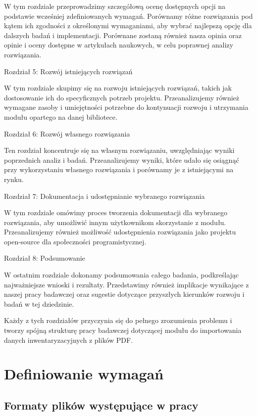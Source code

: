 \documentclass[a4paper,twoside,12pt]{book}
\begin{document}
W tym rozdziale przeprowadzimy szczegółową ocenę dostępnych opcji na podstawie wcześniej zdefiniowanych wymagań. Porównamy różne rozwiązania pod kątem ich zgodności z określonymi wymaganiami, aby wybrać najlepszą opcję dla dalszych badań i implementacji. Porównane zostaną również nasza opinia oraz opinie i oceny dostępne w artykułach naukowych, w celu poprawnej analizy rozwiązania.

Rozdział 5: Rozwój istniejących rozwiązań

W tym rozdziale skupimy się na rozwoju istniejących rozwiązań, takich jak dostosowanie ich do specyficznych potrzeb  projektu. Przeanalizujemy również wymagane zasoby i umiejętności potrzebne do kontynuacji rozwoju i utrzymania modułu opartego na danej bibliotece.

Rozdział 6: Rozwój własnego rozwiązania

Ten rozdział koncentruje się na własnym rozwiązaniu, uwzględniając wyniki poprzednich analiz i badań. Przeanalizujemy wyniki, które udało się osiągnąć przy wykorzystaniu własnego rozwiązania i porównamy je z istniejącymi na rynku.

Rozdział 7: Dokumentacja i udostępnianie wybranego rozwiązania

W tym rozdziale omówimy proces tworzenia dokumentacji dla wybranego rozwiązania, aby umożliwić innym użytkownikom skorzystanie z modułu. Przeanalizujemy również możliwość udostępnienia rozwiązania jako projektu open-source dla społeczności programistycznej.

Rozdział 8: Podsumowanie

W ostatnim rozdziale dokonamy podsumowania całego badania, podkreślając najważniejsze wnioski i rezultaty. Przedstawimy również implikacje wynikające z naszej pracy badawczej oraz sugestie dotyczące przyszłych kierunków rozwoju i badań w tej dziedzinie.

Każdy z tych rozdziałów przyczynia się do pełnego zrozumienia problemu i tworzy spójną strukturę pracy badawczej dotyczącej modułu do importowania danych inwentaryzacyjnych z plików PDF.


\chapter{Definiowanie wymagań}  %
% 

\section{Formaty plików występujące w pracy}
\end{document}
